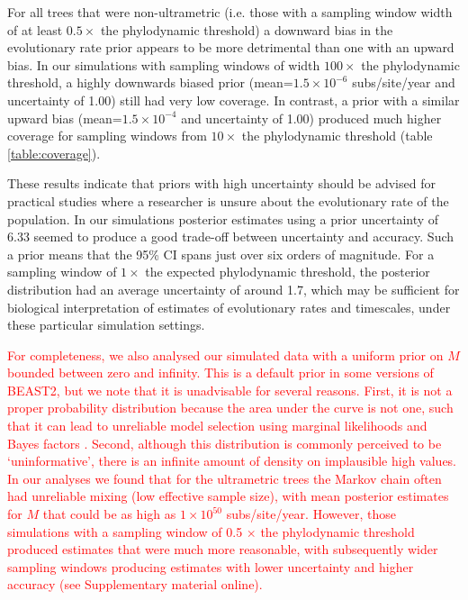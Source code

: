 \documentclass[11pt]{article}
\begin{document}
For all trees that were non-ultrametric (i.e. those with a sampling window width of at least $0.5\times$ the phylodynamic threshold) a downward bias in the evolutionary rate prior appears to be more detrimental than one with an upward bias. In our simulations with sampling windows of width $100\times$ the phylodynamic threshold, a highly downwards biased prior (mean=$1.5\times 10^{-6}$ subs/site/year and uncertainty of 1.00) still had very low coverage. In contrast, a prior with a similar upward bias (mean=$1.5\times 10^{-4}$ and uncertainty of 1.00) produced much higher coverage for sampling windows from $10\times$ the phylodynamic threshold (table \ref{table:coverage}). 

These results indicate that priors with high uncertainty should be advised for practical studies where a researcher is unsure about the evolutionary rate of the population. In our simulations posterior estimates using a prior uncertainty of 6.33 seemed to produce a good trade-off between uncertainty and accuracy. Such a prior means that the 95\% CI spans just over six orders of magnitude. For a sampling window of $1\times$ the expected phylodynamic threshold, the posterior distribution had an average uncertainty of around 1.7, which may be sufficient for biological interpretation of estimates of evolutionary rates and timescales, under these particular simulation settings.

\textcolor{red}{For completeness, we also analysed our simulated data with a uniform prior on $M$ bounded between zero and infinity. This is a default prior in some versions of BEAST2, but we note that it is unadvisable for several reasons. First, it is not a proper probability distribution because the area under the curve is not one, such that it can lead to unreliable model selection using marginal likelihoods and Bayes factors \citep{r2019marginal, fourment202019}. Second, although this distribution is commonly perceived to be `uninformative', there is an infinite amount of density on implausible high values. In our analyses we found that for the ultrametric trees the Markov chain often had unreliable mixing (low effective sample size), with mean posterior estimates for $M$ that could be as high as $1\times10^{50}$ subs/site/year. However, those simulations with a sampling window of 0.5 $\times$ the phylodynamic threshold produced estimates that were much more reasonable, with subsequently wider sampling windows producing estimates with lower uncertainty and higher accuracy (see Supplementary material online).}
\end{document}

